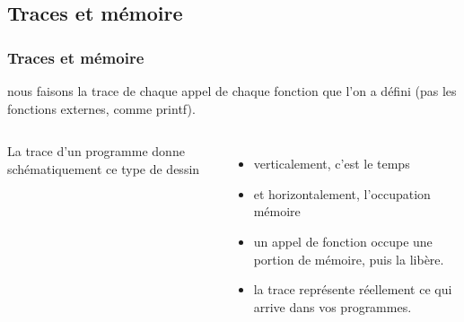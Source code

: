 \documentclass[xcolor=pdftex,svgnames,table]{beamer}
\begin{document}
\subsection{Traces et mémoire}
\begin{frame}
  \frametitle{Traces et mémoire \nowrite}
\noindent {} 
nous faisons la trace de chaque appel de chaque fonction que
l'on a défini (pas les fonctions externes, comme printf). 

\pause
\begin{columns}
\column[T]{6cm}
La trace d'un programme donne schématiquement ce type de dessin
\begin{itemize}
  \item<3-> verticalement, c'est le temps
  \item<3-> et horizontalement, l'occupation mémoire
  \item<4-> un appel de fonction occupe une portion de mémoire, puis la
    libère. 
\item<5-> la trace représente réellement ce qui arrive dans vos programmes.
\end{itemize}


\end{columns}
\end{frame}
\end{document}
